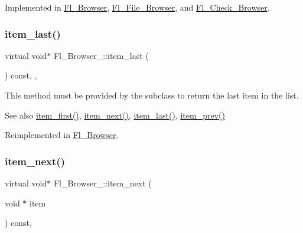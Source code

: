 Implemented in \hyperlink{class_fl___browser_a57103fdfb68bbe7ebb8bbe133ebe9009}{Fl\+\_\+\+Browser}, \hyperlink{class_fl___file___browser_adecceb89eda245a4d8fc03545f156107}{Fl\+\_\+\+File\+\_\+\+Browser}, and \hyperlink{class_fl___check___browser_ac026b8efc935db4f9481c1aa05e43fe5}{Fl\+\_\+\+Check\+\_\+\+Browser}.

\mbox{\label{class_fl___browser___a2302bec54f4ea593146be5490a7fe93b}} 
\subsubsection{\texorpdfstring{item\+\_\+last()}{item\_last()}}
{\footnotesize\ttfamily virtual void$\ast$ Fl\+\_\+\+Browser\+\_\+\+::item\+\_\+last (\begin{DoxyParamCaption}{ }\end{DoxyParamCaption}) const\hspace{0.3cm}{\ttfamily [inline]}, {\ttfamily [protected]}, {\ttfamily [virtual]}}

This method must be provided by the subclass to return the last item in the list. \begin{DoxySeeAlso}{See also}
\hyperlink{class_fl___browser___a43dd6231f2684f132a5a33b5d7d0c8e7}{item\+\_\+first()}, \hyperlink{class_fl___browser___aca6035552f5e9ecbeaa6caaf5fb8a3cb}{item\+\_\+next()}, \hyperlink{class_fl___browser___a2302bec54f4ea593146be5490a7fe93b}{item\+\_\+last()}, \hyperlink{class_fl___browser___afeb24ca0dbd8e4685fa18382512c94d3}{item\+\_\+prev()} 
\end{DoxySeeAlso}


Reimplemented in \hyperlink{class_fl___browser_a5de7360f3e39ad20c3bf552893a92626}{Fl\+\_\+\+Browser}.

\mbox{\label{class_fl___browser___aca6035552f5e9ecbeaa6caaf5fb8a3cb}} 
\subsubsection{\texorpdfstring{item\+\_\+next()}{item\_next()}}
{\footnotesize\ttfamily virtual void$\ast$ Fl\+\_\+\+Browser\+\_\+\+::item\+\_\+next (\begin{DoxyParamCaption}\item[{void $\ast$}]{item }\end{DoxyParamCaption}) const\hspace{0.3cm}{\ttfamily [protected]}, {}}


